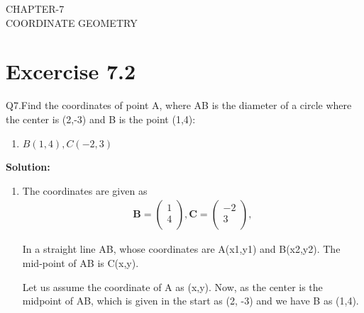 \documentclass[12pt]{article}
\providecommand{\brak}[1]{\ensuremath{\left(#1\right)}}
\newcommand{\solution}{\noindent \textbf{Solution: }}
\newcommand{\myvec}[1]{\ensuremath{\begin{pmatrix}#1\end{pmatrix}}}
\let\vec\mathbf
\begin{document}
\begin{center}
\textbf\large{CHAPTER-7 \\ COORDINATE GEOMETRY}

\end{center}
\section*{Excercise 7.2}

Q7.Find the coordinates of point A, where AB is the diameter of a circle where the center is (2,-3) and B is the point (1,4):
\begin{enumerate}
	\item $B\brak{1,4}, C\brak{-2,3}$
\end{enumerate}
\solution
\begin{enumerate}
\item The coordinates are given as
	\begin{align}
	\vec{B} = \myvec{
		1\\
	    4\\
		},
	\vec{C} = \myvec{
	   -2\\
		3\\
		},
	\end{align}
	
In a straight line AB, whose coordinates are A(x1,y1) and B(x2,y2). The mid-point of AB is C(x,y). 
	


Let us assume the coordinate of A as (x,y). Now, as the center is the midpoint of AB, which is given in the start as (2, -3) and we have B as (1,4).
		

\end{enumerate}
\end{document}
